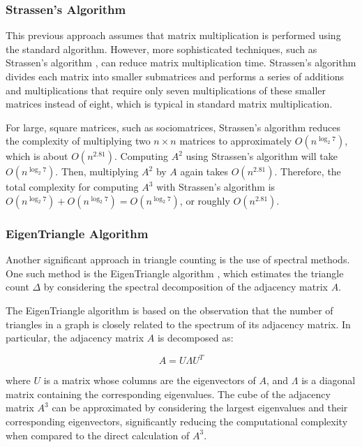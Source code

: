 \documentclass[12pt]{report}
\begin{document}
\subsubsection{Strassen's Algorithm}

This previous approach assumes that matrix multiplication is performed using the standard algorithm.
However, more sophisticated techniques, such as Strassen's algorithm \cite{strassen_gaussian_1969}, can reduce matrix multiplication time.
Strassen's algorithm divides each matrix into smaller submatrices and performs a series of additions and multiplications that require only seven multiplications of these smaller matrices instead of eight, which is typical in standard matrix multiplication.

For large, square matrices, such as sociomatrices, Strassen's algorithm reduces the complexity of multiplying two $n \times n$ matrices to approximately $O(n^{\log_2 7})$, which is about $O(n^{2.81})$.
Computing $A^2$ using Strassen's algorithm will take $O(n^{\log_2 7})$.
Then, multiplying $A^2$ by $A$ again takes $O(n^{2.81})$.
Therefore, the total complexity for computing $A^3$ with Strassen's algorithm is $O(n^{\log_2 7}) + O(n^{\log_2 7}) = O(n^{\log_2 7})$, or roughly $O(n^{2.81})$.

\subsubsection{EigenTriangle Algorithm}

Another significant approach in triangle counting is the use of spectral methods.
One such method is the EigenTriangle algorithm \cite{tsourakakis_fast_2008}, which estimates the triangle count $\Delta$ by considering the spectral decomposition of the adjacency matrix $A$.

The EigenTriangle algorithm is based on the observation that the number of triangles in a graph is closely related to the spectrum of its adjacency matrix.
In particular, the adjacency matrix $A$ is decomposed as:

\[
A = U \Lambda U^T
\]

where $U$ is a matrix whose columns are the eigenvectors of $A$, and $\Lambda$ is a diagonal matrix containing the corresponding eigenvalues.
The cube of the adjacency matrix $A^3$ can be approximated by considering the largest eigenvalues and their corresponding eigenvectors, significantly reducing the computational complexity when compared to the direct calculation of $A^3$.
\end{document}
